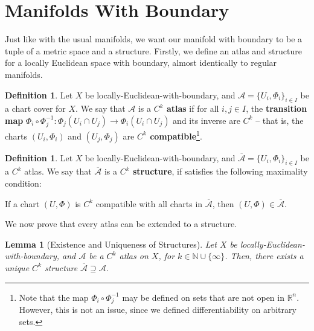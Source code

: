 \documentclass{article}
\newcommand{\N}{\mathbb{N}}
\newcommand{\R}{\mathbb{R}}
\newcommand{\cl}[1]{\overline{#1}}
\newcommand{\atl}[1]{\mathcal{#1}}
\newcommand{\str}[1]{\cl{\atl{#1}}}
\theoremstyle{plain} %
\numberwithin{thm}{section} %
\newtheorem{lemma}[thm]{Lemma}
\theoremstyle{definition} %
\newtheorem{defn}[thm]{Definition}
\begin{document}
\section{Manifolds With Boundary}

Just like with the usual manifolds, we want our manifold with boundary to be a tuple of a metric space and a structure. Firstly, we define an atlas and structure for a locally Euclidean space with boundary, almost identically to regular manifolds.

\begin{defn}
    \label{atllewb}
    Let $X$ be locally-Euclidean-with-boundary, and $\atl{A} = \{U_i, \Phi_i\}_{i \in I}$ be a chart cover for $X$. We say that $\atl{A}$ is a \textbf{$C^k$ atlas} if for all $i, j \in I$, the \textbf{transition map} $\Phi_i \circ \Phi_j^{-1}: \Phi_j(U_i \cap U_j) \to \Phi_i(U_i \cap U_j)$ and its inverse are $C^k$ -- that is, the charts $(U_i, \Phi_i)$ and $(U_j, \Phi_j)$ are \textbf{$C^k$ compatible}\footnote{Note that the map $\Phi_i \circ \Phi_j^{-1}$ may be defined on sets that are not open in $\R^n$. However, this is not an issue, since we defined differentiability on arbitrary sets.}.
\end{defn}

\begin{defn}
    Let $X$ be locally-Euclidean-with-boundary, and $\str{A} = \{U_i, \Phi_i\}_{i \in I}$ be a $C^k$ atlas. We say that $\str{A}$ is a \textbf{$C^k$ structure}, if satisfies the following maximality condition:
    \begin{center}
        If a chart $(U, \Phi)$ is $C^k$ compatible with all charts in $\str{A}$, then $(U, \Phi) \in \str{A}$.
    \end{center}
\end{defn}

We now prove that every atlas can be extended to a structure.

\begin{lemma}[Existence and Uniqueness of Structures]
    \label{atltostr}
    Let $X$ be locally-Euclidean-with-boundary, and $\atl{A}$ be a $C^k$ atlas on $X$, for $k \in \N \cup \{\infty\}$. Then, there exists a unique $C^k$ structure $\cl{\atl{A}} \supseteq \atl{A}$.
\end{lemma}
\end{document}
